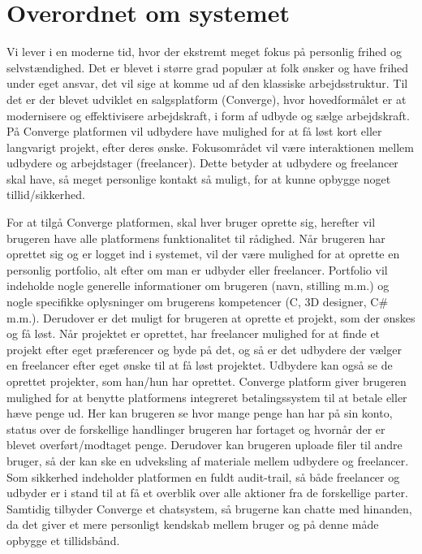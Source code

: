 \chapter{Overordnet om systemet}

Vi lever i en moderne tid, hvor der ekstremt meget fokus på personlig frihed og selvstændighed. Det er blevet i større grad populær at folk ønsker og have frihed under eget ansvar, det vil sige at komme ud af den klassiske arbejdsstruktur. Til det er der blevet udviklet en salgsplatform (Converge), hvor hovedformålet er at modernisere og effektivisere arbejdskraft, i form af udbyde og sælge arbejdskraft.  På Converge platformen vil udbydere have mulighed for at få løst kort eller langvarigt projekt, efter deres ønske. Fokusområdet vil være interaktionen mellem udbydere og arbejdstager (freelancer).  Dette betyder at udbydere og freelancer skal have, så meget personlige kontakt så muligt, for at kunne opbygge noget tillid/sikkerhed. 


For at tilgå Converge platformen, skal hver bruger oprette sig, herefter vil brugeren have alle platformens funktionalitet til rådighed. Når brugeren har oprettet sig og er logget ind i systemet, vil der være mulighed for at oprette en personlig portfolio, alt efter om man er udbyder eller freelancer. Portfolio vil indeholde nogle generelle informationer om brugeren (navn, stilling m.m.) og nogle specifikke oplysninger om brugerens kompetencer (C, 3D designer, C\# m.m.).  Derudover er det muligt for brugeren at oprette et projekt, som der ønskes og få løst. Når projektet er oprettet, har freelancer mulighed for at finde et projekt efter eget præferencer og byde på det, og så er det udbydere der vælger en freelancer efter eget ønske til at få løst projektet. Udbydere kan også se de oprettet projekter, som han/hun har oprettet.  Converge platform giver brugeren mulighed for at benytte platformens integreret betalingssystem til at betale eller hæve penge ud. Her kan brugeren se hvor mange penge han har på sin konto, status over de forskellige handlinger brugeren har fortaget og hvornår der er blevet overført/modtaget penge. Derudover kan brugeren uploade filer til andre bruger, så der kan ske en udveksling af materiale mellem udbydere og freelancer. Som sikkerhed indeholder platformen en fuldt audit-trail, så både freelancer og udbyder er i stand til at få et overblik over alle aktioner fra de forskellige parter. Samtidig tilbyder Converge et chatsystem, så brugerne kan chatte med hinanden, da det giver et mere personligt kendskab mellem bruger og på denne måde opbygge et tillidsbånd.   

